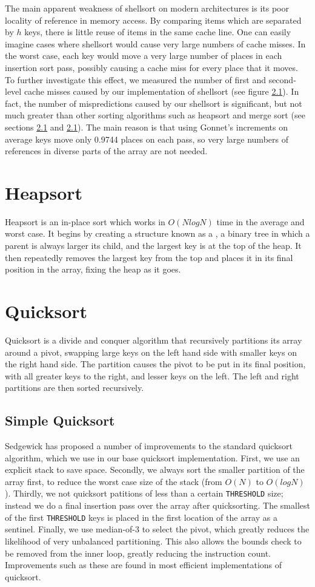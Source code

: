 \documentclass[acmtocl]{acmtrans2m}
\begin{document}
The main apparent weakness of shellsort on modern architectures is its
poor locality of reference in memory access.  By comparing items which
are separated by $h$ keys, there is little reuse of items in the same
cache line. One can easily imagine cases where shellsort would cause
very large numbers of cache misses.  In the worst case, each key would
move a very large number of places in each insertion sort pass,
possibly causing a cache miss for every place that it moves.  To
further investigate this effect, we measured the number of first and
second-level cache misses caused by our implementation of shellsort
(see figure \ref{}). In fact, the number of mispredictions caused by
our shellsort is significant, but not much greater than other sorting
algorithms such as heapsort and merge sort (see sections \ref{} and
\ref{}). The main reason is that using Gonnet's increments on average
keys move only 0.9744 places on each pass, so very large numbers of
references in diverse parts of the array are not needed.

\section{Heapsort}
Heapsort is an in-place sort which works in $O(NlogN)$ time in the
average and worst case. It begins by creating a structure known as a
, a binary tree in which a parent is always larger its child,
and the largest key is at the top of the heap. It then repeatedly
removes the largest key from the top and places it in its final
position in the array, fixing the heap as it goes.


\section{Quicksort}
Quicksort is a divide and conquer algorithm that recursively
partitions its array around a pivot, swapping large keys on the left
hand side with smaller keys on the right hand side. The partition
causes the pivot to be put in its final position, with all greater
keys to the right, and lesser keys on the left. The left and right
partitions are then sorted recursively.

\subsection{Simple Quicksort}
Sedgewick \cite{} has proposed a number of improvements to the
standard quicksort algorithm, which we use in our base quicksort
implementation. First, we use an explicit stack to save space.
Secondly, we always sort the smaller partition of the array first, to
reduce the worst case size of the stack (from $O(N)$ to
$O(logN)$). Thirdly, we not quicksort patitions of less than a certain
\texttt{THRESHOLD} size; instead we do a final insertion pass over the
array after quicksorting. The smallest of the first \texttt{THRESHOLD}
keys is placed in the first location of the array as a
sentinel. Finally, we use median-of-3 to select the pivot, which
greatly reduces the likelihood of very unbalanced partitioning. This
also allows the bounds check to be removed from the inner loop,
greatly reducing the instruction count. Improvements such as these are
found in most efficient implementations of quicksort.
\end{document}
